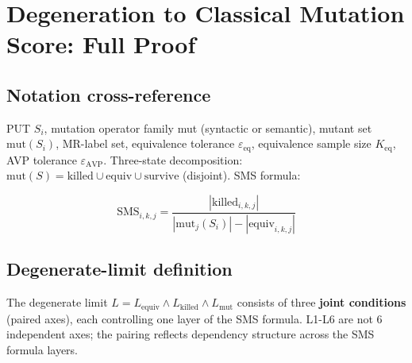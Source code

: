 \documentclass[manuscript,screen,review]{acmart}
\begin{document}

\section{Degeneration to Classical Mutation Score: Full Proof}\label{g.-sms-ms-degeneration-theorem-full-proof}

\subsection{Notation cross-reference}\label{g.1-notation-cross-reference-with-2.1}

PUT $S_i$, mutation operator family mut (syntactic or semantic),
mutant set $\mathrm{mut}(S_i)$, MR-label set, equivalence tolerance $\varepsilon_{\mathrm{eq}}$, equivalence
sample size $K_{\mathrm{eq}}$, AVP tolerance $\varepsilon_{\mathrm{AVP}}$. Three-state decomposition:
$\mathrm{mut}(S)=\mathrm{killed} \cup \mathrm{equiv} \cup \mathrm{survive}$ (disjoint). SMS
formula:

\[
\mathrm{SMS}_{i,k,j} = \frac{|\mathrm{killed}_{i,k,j}|}{|\mathrm{mut}_j(S_i)| - |\mathrm{equiv}_{i,k,j}|}
\]

\subsection{Degenerate-limit definition}\label{g.2-degenerate-limit-definition-r-8-p1-3-revision-3-joint-conditions}

The degenerate limit $L = L_{\mathrm{equiv}} \wedge L_{\mathrm{killed}} \wedge L_{\mathrm{mut}}$
consists of three \textbf{joint conditions} (paired axes), each
controlling one layer of the SMS formula. L1-L6 are not 6 independent
axes; the pairing reflects dependency structure across the SMS formula
layers.
\end{document}
